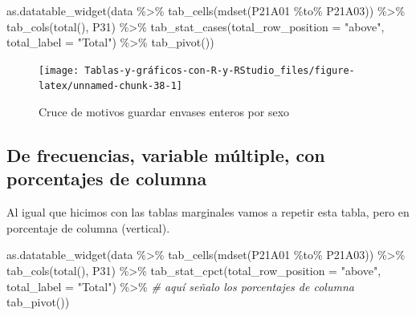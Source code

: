 \documentclass[
]{book}
\newenvironment{Shaded}{\begin{snugshade}}{\end{snugshade}}
\newcommand{\AttributeTok}[1]{\textcolor[rgb]{0.77,0.63,0.00}{#1}}
\newcommand{\CommentTok}[1]{\textcolor[rgb]{0.56,0.35,0.01}{\textit{#1}}}
\newcommand{\FunctionTok}[1]{\textcolor[rgb]{0.00,0.00,0.00}{#1}}
\newcommand{\NormalTok}[1]{#1}
\newcommand{\SpecialCharTok}[1]{\textcolor[rgb]{0.00,0.00,0.00}{#1}}
\newcommand{\StringTok}[1]{\textcolor[rgb]{0.31,0.60,0.02}{#1}}
\begin{document}
\begin{Shaded}
\begin{Highlighting}[]
\FunctionTok{as.datatable\_widget}\NormalTok{(data }\SpecialCharTok{\%\textgreater{}\%} \FunctionTok{tab\_cells}\NormalTok{(}\FunctionTok{mdset}\NormalTok{(P21A01 }\SpecialCharTok{\%to\%} 
\NormalTok{  P21A03)) }\SpecialCharTok{\%\textgreater{}\%} \FunctionTok{tab\_cols}\NormalTok{(}\FunctionTok{total}\NormalTok{(), P31) }\SpecialCharTok{\%\textgreater{}\%} \FunctionTok{tab\_stat\_cases}\NormalTok{(}\AttributeTok{total\_row\_position =} \StringTok{"above"}\NormalTok{, }
  \AttributeTok{total\_label =} \StringTok{"Total"}\NormalTok{) }\SpecialCharTok{\%\textgreater{}\%} \FunctionTok{tab\_pivot}\NormalTok{())}
\end{Highlighting}
\end{Shaded}

\begin{figure}[H]

{\centering \texttt{[image: Tablas-y-gráficos-con-R-y-RStudio\_files/figure-latex/unnamed-chunk-38-1]} 

}

\caption{Cruce de motivos guardar envases enteros por sexo}\label{fig:unnamed-chunk-38}
\end{figure}

\hypertarget{de-frecuencias-variable-muxfaltiple-con-porcentajes-de-columna}{%
\subsection{De frecuencias, variable múltiple, con porcentajes de columna}\label{de-frecuencias-variable-muxfaltiple-con-porcentajes-de-columna}}

Al igual que hicimos con las tablas marginales vamos a repetir esta tabla, pero en porcentaje de columna (vertical).

\begin{Shaded}
\begin{Highlighting}[]
\FunctionTok{as.datatable\_widget}\NormalTok{(data }\SpecialCharTok{\%\textgreater{}\%}
    \FunctionTok{tab\_cells}\NormalTok{(}\FunctionTok{mdset}\NormalTok{(P21A01 }\SpecialCharTok{\%to\%}\NormalTok{ P21A03)) }\SpecialCharTok{\%\textgreater{}\%}
    \FunctionTok{tab\_cols}\NormalTok{(}\FunctionTok{total}\NormalTok{(), P31) }\SpecialCharTok{\%\textgreater{}\%}
    \FunctionTok{tab\_stat\_cpct}\NormalTok{(}\AttributeTok{total\_row\_position =} \StringTok{"above"}\NormalTok{, }\AttributeTok{total\_label =} \StringTok{"Total"}\NormalTok{) }\SpecialCharTok{\%\textgreater{}\%} \CommentTok{\# aquí señalo los porcentajes de columna}
    \FunctionTok{tab\_pivot}\NormalTok{())}
\end{Highlighting}
\end{Shaded}
\end{document}
